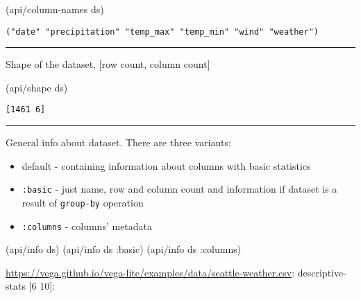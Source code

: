 \documentclass[]{article}
\newenvironment{Shaded}{\begin{snugshade}}{\end{snugshade}}
\newcommand{\AttributeTok}[1]{\textcolor[rgb]{0.77,0.63,0.00}{#1}}
\newcommand{\NormalTok}[1]{#1}
\providecommand{\tightlist}{%
  \setlength{\itemsep}{0pt}\setlength{\parskip}{0pt}}
\begin{document}
\begin{Shaded}
\begin{Highlighting}[]
\NormalTok{(api/column-names ds)}
\end{Highlighting}
\end{Shaded}

\begin{verbatim}
("date" "precipitation" "temp_max" "temp_min" "wind" "weather")
\end{verbatim}

\begin{center}\rule{0.5\linewidth}{0.5pt}\end{center}

Shape of the dataset, {[}row count, column count{]}

\begin{Shaded}
\begin{Highlighting}[]
\NormalTok{(api/shape ds)}
\end{Highlighting}
\end{Shaded}

\begin{verbatim}
[1461 6]
\end{verbatim}

\begin{center}\rule{0.5\linewidth}{0.5pt}\end{center}

General info about dataset. There are three variants:

\begin{itemize}
\tightlist
\item
  default - containing information about columns with basic statistics
\item
  \texttt{:basic} - just name, row and column count and information if
  dataset is a result of \texttt{group-by} operation
\item
  \texttt{:columns} - columns' metadata
\end{itemize}

\begin{Shaded}
\begin{Highlighting}[]
\NormalTok{(api/info ds)}
\NormalTok{(api/info ds }\AttributeTok{:basic}\NormalTok{)}
\NormalTok{(api/info ds }\AttributeTok{:columns}\NormalTok{)}
\end{Highlighting}
\end{Shaded}

\url{https://vega.github.io/vega-lite/examples/data/seattle-weather.csv}:
descriptive-stats {[}6 10{]}:
\end{document}
